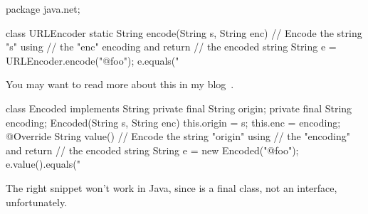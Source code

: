 \documentclass{article}
\begin{document}
\begin{pptWide}{2}
{\scriptsize\begin{ffcode}
package java.net;

class URLEncoder {
  static String encode(String s, String enc) {
    // Encode the string "s" using
    // the "enc" encoding and return
    // the encoded string
  }
}
String e = URLEncoder.encode("@foo");
e.equals("%
\end{ffcode}
}
You may want to read more about this in
my blog~\citep{bugayenko2015blog0309,bugayenko2017blog0912}.
\par\columnbreak\par
{\scriptsize\begin{ffcode}
class Encoded implements String {
  private final String origin;
  private final String encoding;
  Encoded(String s, String enc) {
    this.origin = s;
    this.enc = encoding;
  }
  @Override String value() {
    // Encode the string "origin" using
    // the "encoding" and return
    // the encoded string
  }
}
String e = new Encoded("@foo");
e.value().equals("%
\end{ffcode}
}
\end{pptWide}
\par
The right snippet won't work in Java, since  is a final class, not an interface, unfortunately.
\plush{}

\end{document}
